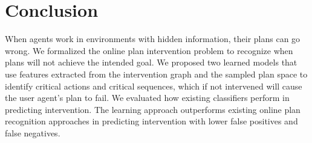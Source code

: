 \documentclass[letterpaper]{article}
\theoremstyle{plain}
\begin{document}
\section{Conclusion}
When agents work in environments with hidden information, their plans can go wrong.
We formalized the online plan intervention problem to recognize when plans will not achieve the intended goal. We proposed two learned models that use features extracted from the intervention graph and the sampled plan space to identify critical actions and critical sequences, which if not intervened will cause the user agent's plan to fail. We evaluated how existing classifiers perform in predicting intervention. The learning approach outperforms existing online plan recognition approaches in predicting intervention with lower false positives and false negatives. %
\clearpage %
\begin{small}


\end{small}
\end{document}

